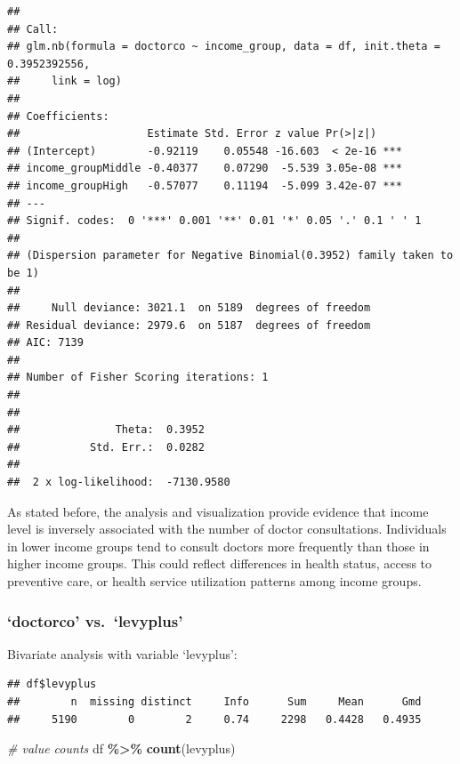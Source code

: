 \documentclass[
]{article}
\newenvironment{Shaded}{\begin{snugshade}}{\end{snugshade}}
\newcommand{\CommentTok}[1]{\textcolor[rgb]{0.56,0.35,0.01}{\textit{#1}}}
\newcommand{\FunctionTok}[1]{\textcolor[rgb]{0.13,0.29,0.53}{\textbf{#1}}}
\newcommand{\NormalTok}[1]{#1}
\newcommand{\SpecialCharTok}[1]{\textcolor[rgb]{0.81,0.36,0.00}{\textbf{#1}}}
\begin{document}
\begin{verbatim}
## 
## Call:
## glm.nb(formula = doctorco ~ income_group, data = df, init.theta = 0.3952392556, 
##     link = log)
## 
## Coefficients:
##                    Estimate Std. Error z value Pr(>|z|)    
## (Intercept)        -0.92119    0.05548 -16.603  < 2e-16 ***
## income_groupMiddle -0.40377    0.07290  -5.539 3.05e-08 ***
## income_groupHigh   -0.57077    0.11194  -5.099 3.42e-07 ***
## ---
## Signif. codes:  0 '***' 0.001 '**' 0.01 '*' 0.05 '.' 0.1 ' ' 1
## 
## (Dispersion parameter for Negative Binomial(0.3952) family taken to be 1)
## 
##     Null deviance: 3021.1  on 5189  degrees of freedom
## Residual deviance: 2979.6  on 5187  degrees of freedom
## AIC: 7139
## 
## Number of Fisher Scoring iterations: 1
## 
## 
##               Theta:  0.3952 
##           Std. Err.:  0.0282 
## 
##  2 x log-likelihood:  -7130.9580
\end{verbatim}

As stated before, the analysis and visualization provide evidence that
income level is inversely associated with the number of doctor
consultations. Individuals in lower income groups tend to consult
doctors more frequently than those in higher income groups. This could
reflect differences in health status, access to preventive care, or
health service utilization patterns among income groups.

\subsubsection{`doctorco' vs.~`levyplus'}\label{doctorco-vs.-levyplus}

Bivariate analysis with variable `levyplus':

\begin{Shaded}
\end{Shaded}

\begin{verbatim}
## df$levyplus 
##        n  missing distinct     Info      Sum     Mean      Gmd 
##     5190        0        2     0.74     2298   0.4428   0.4935
\end{verbatim}

\begin{Shaded}
\begin{Highlighting}[]
\CommentTok{\# value counts}
\NormalTok{df }\SpecialCharTok{\%\textgreater{}\%} \FunctionTok{count}\NormalTok{(levyplus)}
\end{Highlighting}
\end{Shaded}
\end{document}

